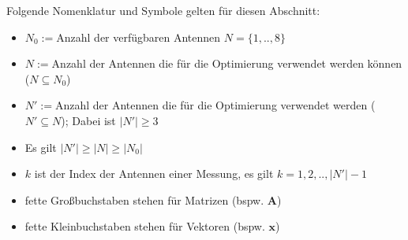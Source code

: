 {
\small
Folgende Nomenklatur und Symbole gelten für diesen Abschnitt:
\begin{itemize}[itemsep=0mm]
	\item	$N_0:=$Anzahl der verfügbaren Antennen $N=\{1,..,8\}$
	\item	$N:=$Anzahl der Antennen die für die Optimierung verwendet werden können ($N \subseteq N_0$)    
	\item	$N':=$Anzahl der Antennen die für die Optimierung verwendet werden ($N' \subseteq N$); Dabei ist $|N'| \geq 3$
	\item	Es gilt $|N'| \geq |N| \geq |N_0|$   
	\item	$k$ ist der Index der Antennen einer Messung, es gilt $k = 1,2,..,|N'|-1$
	\item	fette Großbuchstaben stehen für Matrizen (bspw. $\mathbf{A}$)
	\item	fette Kleinbuchstaben stehen für Vektoren (bspw. $\mathbf{x}$)
	

\end{itemize}}
